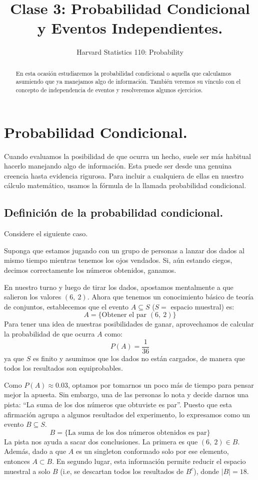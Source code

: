 \documentclass[12pt]{article}
\title{Clase 3: Probabilidad Condicional y Eventos Independientes.}
\author{Harvard Statistics 110: Probability}
\date{}
\begin{document}
\maketitle

\begin{abstract}
\noindent En esta ocasión estudiaremos la probabilidad condicional o aquella que calculamos asumiendo que ya manejamos algo de información. También veremos su vínculo con el concepto de independencia de eventos y resolveremos algunos ejercicios.
\end{abstract}


\section{Probabilidad Condicional.}

Cuando evaluamos la posibilidad de que ocurra un hecho, suele ser más habitual hacerlo manejando algo de información. Esta puede ser desde una genuina creencia hasta evidencia rigurosa. Para incluir a cualquiera de ellas en nuestro cálculo matemático, usamos la fórmula de la llamada probabilidad condicional.

\subsection{Definición de la probabilidad condicional.}

Considere el siguiente caso.

Suponga que estamos jugando con un grupo de personas a lanzar dos dados al mismo tiempo mientras tenemos los ojos vendados. Si, aún estando ciegos, decimos correctamente los números obtenidos, ganamos.

En nuestro turno y luego de tirar los dados, apostamos mentalmente a que salieron los valores $(6, \ 2)$. Ahora que tenemos un conocimiento básico de teoría de conjuntos, establecemos que el evento $A \subseteq S$ ($S = $ espacio muestral) es:
\[
  A = \{\text{Obtener el par } (6, \ 2)\}
\]
Para tener una idea de nuestras posibilidades de ganar, aprovechamos de calcular la probabilidad de que ocurra $A$ como:
\[
  P(A) = \frac{1}{36}
\]
ya que $S$ es finito y asumimos que los dados no están cargados, de manera que todos los resultados son equiprobables.

Como $P(A) \approx 0.03$, optamos por tomarnos un poco más de tiempo para pensar mejor la apuesta. Sin embargo, una de las personas lo nota y decide darnos una pista: ``La suma de los dos números que obtuviste es par''. Puesto que esta afirmación agrupa a algunos resultados del experimento, lo expresamos como un evento $B \subseteq S$.
\[
  B = \{\text{La suma de los dos números obtenidos es par}\}
\]
La pista nos ayuda a sacar dos conclusiones. La primera es que $(6, \ 2) \in B$. Además, dado a que $A$ es un singleton conformado solo por ese elemento, entonces $A \subset B$. En segundo lugar, esta información permite reducir el espacio muestral a solo $B$ (i.e, se descartan todos los resultados de $B^{c}$), donde $|B| = 18$.
\end{document}
